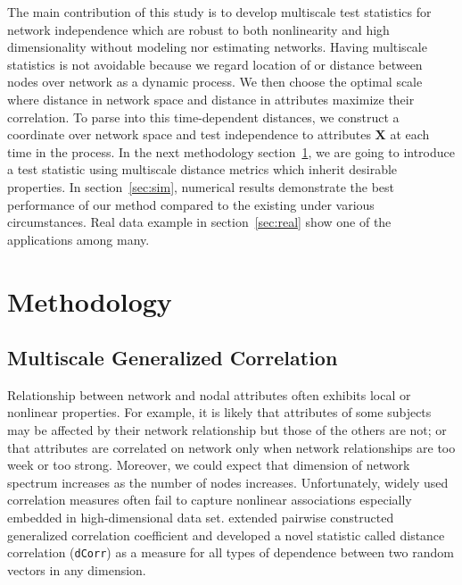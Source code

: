 \documentclass[12pt]{article}
\theoremstyle{definition}
\begin{document}
The main contribution of this study is to develop multiscale test statistics for network independence which are robust to both nonlinearity and high dimensionality without modeling nor estimating networks. Having multiscale statistics is not avoidable because we regard location of or distance between nodes over network as a dynamic process. We then choose the optimal scale where distance in network space and distance in attributes maximize their correlation. To parse into this time-dependent distances, we construct a coordinate over network space and test independence to attributes $\mathbf{X}$ at each time in the process. In the next methodology section~\ref{sec:method}, we are going to introduce a test statistic using multiscale distance metrics which inherit desirable properties. In section~\ref{sec:sim}, numerical results demonstrate the best performance of our method compared to the existing under various circumstances. Real data example in section~\ref{sec:real} show one of the applications among many.  
	
\bigskip
\section{Methodology}
\label{sec:method}

\subsection{Multiscale Generalized Correlation}

Relationship between network and nodal attributes often exhibits local or nonlinear properties. For example, it is likely that attributes of some subjects may be affected by their network relationship but those of the others are not; or that attributes are correlated on network only when network relationships are too week or too strong. Moreover, we could expect that dimension of network spectrum increases as the number of nodes increases. Unfortunately, widely used correlation measures often fail to capture nonlinear associations especially embedded in high-dimensional data set. \cite{szekely2007measuring} extended pairwise constructed generalized correlation coefficient and developed a novel statistic called distance correlation (\texttt{dCorr}) as a measure for all types of dependence between two random vectors in any dimension.
\end{document}
